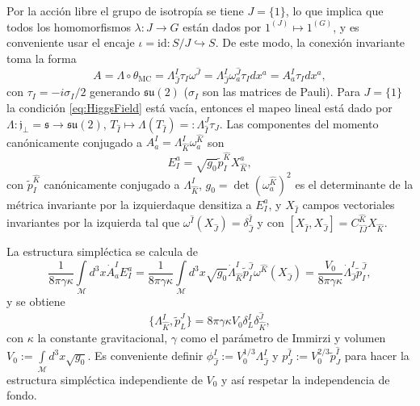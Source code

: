 Por la acci\'{o}n libre el grupo de isotrop\'{i}a se tiene $J=\{1\}$, lo que implica que todos los homomorfismos $\lambda: J \rightarrow G$ est\'{a}n dados por $1^{(J)} \longmapsto 1^{(G)}$, y es conveniente usar el encaje $\iota = \mathrm{id}: S/J \hookrightarrow S$. De este modo, la conexi\'{o}n invariante toma la forma
%
\begin{equation}
A = \Lambda \circ \theta_{\mathrm{MC}} = \Lambda^{I}_{\hat{J}} \tau_{I} \omega^{\hat{J}} =  \Lambda^{I}_{\hat{J}} \omega^{\hat{J}}_{a} \tau_{I} dx^{a}=A^{I}_{a} \tau_{I} dx^{a},
\end{equation}
%
con $\tau_{I} = -i \sigma_{I}/2$ generando $\mathfrak{su}(2)$ ($\sigma_{I}$ son las matrices de Pauli). Para $J=\{1\}$ la condici\'{o}n \eqref{eq:HiggsField} est\'{a} vac\'{i}a, entonces el mapeo lineal est\'{a} dado por $\Lambda: \mathfrak{j}_{\perp} = \mathfrak{s} \longrightarrow \mathfrak{su}(2)$, $T_{\hat{I}} \longmapsto \Lambda(T_{\hat{I}}) =: \Lambda^{J}_{\hat{I}} \tau_{J}$. Las componentes del momento can\'{o}nicamente conjugado a $A^{I}_{a} = \Lambda^{I}_{\hat{K}} \omega^{\hat{K}}_{a}$ son
%
\begin{equation}
E^{a}_{I} = \sqrt{g_{0}} \tilde{p}^{\hat{K}}_{I} X^{a}_{\hat{K}},
\end{equation}
%
con $\tilde{p}^{\hat{K}}_{I}$ can\'{o}nicamente conjugado a $\Lambda^{I}_{\hat{K}}$, $g_{0} = \det(\omega^{\hat{K}}_{a})^{2}$ es el determinante de la m\'{e}trica invariante por la izquierda\footnotemark que densitiza a $E^{a}_{I}$, y $X_{\hat{I}}$ campos vectoriales invariantes por la izquierda tal que $\omega^{\hat{I}}(X_{\hat{J}}) = \delta^{\hat{I}}_{\hat{J}}$ y con $[X_{\hat{I}}, X_{\hat{J}}] = C^{\hat{K}}_{\hat{I} \hat{J}} X_{\hat{K}}$.

La estructura simpl\'{e}ctica se calcula de
%
\begin{equation}
\frac{1}{8 \pi \gamma \kappa} \int\limits_{\mathcal{M}} d^{3} x \dot{A}^{I}_{a} E^{a}_{I} = \frac{1}{8 \pi \gamma \kappa} \int\limits_{\mathcal{M}} d^{3} x \sqrt{g_{0}} \dot{\Lambda}^{I}_{\hat{K}} \tilde{p}^{\hat{J}}_{I} \omega^{\hat{K}} (X_{\hat{J}}) = \frac{V_{0}}{8 \pi \gamma \kappa} \dot{\Lambda}^{I}_{\hat{J}} \tilde{p}^{\hat{J}}_{I},
\end{equation}
%
y se obtiene
%
\begin{equation}
\{\Lambda^{I}_{\hat{K}}, \tilde{p}^{\hat{J}}_{L} \} = 8 \pi \gamma \kappa V_{0} \delta^{I}_{L} \delta^{\hat{J}}_{\hat{K}},
\end{equation}
%
con $\kappa$ la constante gravitacional, $\gamma$ como el par\'{a}metro de Immirzi y volumen $V_{0} := \int\limits_{\mathcal{M}} d^{3} x  \sqrt{g_{0}}$. Es conveniente definir $\phi^{I}_{\hat{J}} := V_{0}^{1/3} \Lambda^{I}_{\hat{J}}$ y $p^{\hat{I}}_{J} := V_{0}^{2/3} \tilde{p}^{\hat{I}}_{J}$ para hacer la estructura simpl\'{e}ctica independiente de $V_{0}$ y as\'{i} respetar la independencia de fondo.

